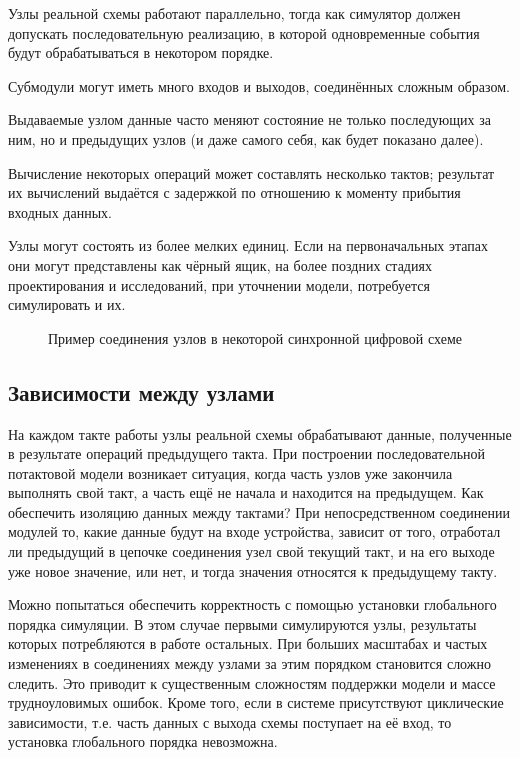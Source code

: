 \begin{itemize*}
    \item Узлы реальной схемы работают параллельно, тогда как симулятор должен допускать последовательную реализацию, в которой одновременные события будут обрабатываться в некотором порядке.
    \item Субмодули могут иметь много входов и выходов, соединённых сложным образом.
    \item Выдаваемые узлом данные часто меняют состояние не только последующих за ним, но и предыдущих узлов (и даже самого себя, как будет показано далее).
    \item Вычисление некоторых операций может составлять несколько тактов; результат их вычислений выдаётся с задержкой по отношению к моменту прибытия входных данных.
    \item Узлы могут состоять из более мелких единиц. Если на первоначальных этапах они могут представлены как чёрный ящик, на более поздних стадиях проектирования и исследований, при  уточнении модели, потребуется симулировать и их.
\end{itemize*}

\begin{figure}[htbp]
    \centering
    \caption[Пример соединения узлов]{Пример соединения узлов в некоторой синхронной цифровой схеме}
    \label{fig:features}
\end{figure}

\subsection{Зависимости между узлами}

На каждом такте работы узлы реальной схемы обрабатывают данные, полученные в результате операций предыдущего такта. При построении последовательной потактовой модели возникает ситуация, когда часть узлов уже закончила выполнять свой такт, а часть ещё не начала и находится на предыдущем. Как обеспечить изоляцию данных между тактами? При непосредственном соединении модулей то, какие данные будут на входе устройства, зависит от того, отработал ли предыдущий в цепочке соединения узел свой текущий такт, и на его выходе уже новое значение, или нет, и тогда значения относятся к предыдущему такту. 

Можно попытаться обеспечить корректность с помощью установки глобального порядка симуляции. В этом случае первыми симулируются узлы, результаты которых потребляются в работе остальных. При больших масштабах и частых изменениях в соединениях между узлами за этим порядком становится сложно следить. Это приводит к существенным сложностям поддержки модели и массе трудноуловимых ошибок. Кроме того, если в системе присутствуют циклические зависимости, т.е. часть данных с выхода схемы поступает на её вход, то установка глобального порядка невозможна.

